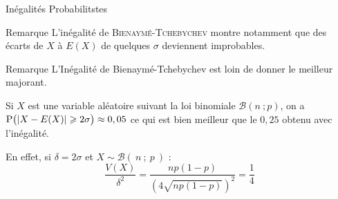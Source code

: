 \documentclass{coursbook}
\begin{document}
\begin{Gpartie}{Inégalités Probabilitstes}
\begin{Spartie}{Remarque}
            L'inégalité de \textsc{Bienaymé-Tchebychev} montre notamment que des écarts de $X$ à $E(X)$ de quelques $\sigma$ deviennent improbables.
        \end{Spartie}
        \begin{Spartie}{Remarque} 
            L'Inégalité de Bienaymé-Tchebychev est loin de donner le meilleur majorant.

            Si $X$ est une variable aléatoire suivant la loi binomiale $\mathcal{B}\left(n~;p\right)$, on a $\mathrm{P}\big(\vert X-E(X)\rvert\geqslant 2\sigma\big)\approx 0,05$ ce qui est bien meilleur que le $0,25$ obtenu avec l'inégalité.

            En effet, si $\delta=2\sigma$ et $X\sim\mathcal{B}(~n~;~p~)$ : \[\frac{V(X)}{\delta^2}=\frac{np(1-p)}{\left(4\sqrt{np(1-p)}\right)^2}=\frac{1}{4}\]
        \end{Spartie}
    \end{Gpartie}
\end{document}
